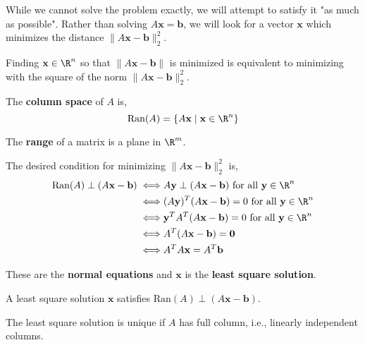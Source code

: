 \noindent While we cannot solve the problem exactly, we will attempt to satisfy it "as much as possible". Rather than solving $A \mathbf{x} = \mathbf{b}$, we will look for a vector $\mathbf{x}$ which minimizes the distance $\|A \mathbf{x} - \mathbf{b}\|^2_2$.

\begin{rmk}
	Finding $\mathbf{x} \in \R^n$ so that $\|A \mathbf{x} - \mathbf{b}\|$ is minimized is equivalent to minimizing with the square of the norm $\|A \mathbf{x} - \mathbf{b}\|_2^2$. 
\end{rmk}

\begin{defn}
	The \textbf{column space} of $A$ is,
	\[\text{Ran}(A) = \{A \mathbf{x} \mid \mathbf{x} \in \R^n\}\]
\end{defn}

\begin{marginfigure}
	The \textbf{range} of a matrix is a plane in $\R^m$.
\end{marginfigure}

\NewLine

\noindent The desired condition for minimizing $\|A \mathbf{x} - \mathbf{b}\|^2_2$ is,
\begin{align*}
	\text{Ran}(A)  \perp (A \mathbf{x} - \mathbf{b}) \iff &A \mathbf{y} \perp (A \mathbf{x} - \mathbf{b}) \text{ for all } \mathbf{y} \in \R^n \\
	\iff &(A \mathbf{y})^T (A \mathbf{x} - \mathbf{b}) = 0 \text{ for all } \mathbf{y} \in \R^n \\
	\iff & \mathbf{y}^T A^T (A \mathbf{x} - \mathbf{b}) = 0 \text{ for all } \mathbf{y} \in \R^n \\
	\iff &A^T (A \mathbf{x} - \mathbf{b}) = \mathbf{0} \\
	\iff &A^T A \mathbf{x} = A^T \mathbf{b}
\end{align*}

\noindent These are the \textbf{normal equations} and $\mathbf{x}$ is the \textbf{least square solution}. 

\begin{rmk}
	A least square solution $\mathbf{x}$ satisfies $\text{Ran}(A) \perp (A\mathbf{x}-\mathbf{b})$.
\end{rmk}

\begin{thm}
	The least square solution is unique if $A$ has full column, i.e., linearly independent columns.
\end{thm}

